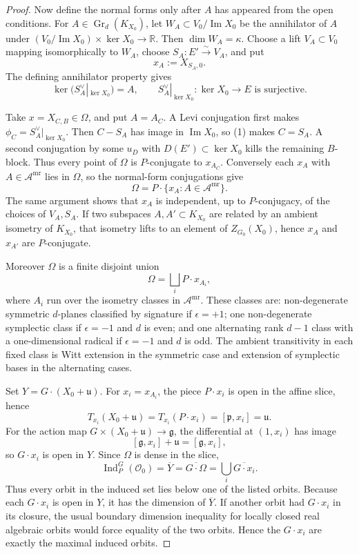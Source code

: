 \documentclass[10pt]{article}
\newcommand{\g}{\mathfrak g}
\newcommand{\uP}{\mathfrak u}
\newcommand{\OO}{\mathcal O}
\newcommand{\K}{K_{X_0}}
\newcommand{\Amr}{\mathscr A^{\mathrm{mr}}}
\newcommand{\im}{\operatorname{Im}}
\begin{document}
\begin{proof}
Now define the normal forms only after \(A\) has appeared from the open
conditions.  For \(A\in\operatorname{Gr}_d(\K)\), let
\(W_A\subset V_0/\im X_0\) be the annihilator of \(A\) under
\((V_0/\im X_0)\times\ker X_0\to\mathbb R\).  Then \(\dim W_A=\kappa\).
Choose a lift \(V_A\subset V_0\) mapping isomorphically to \(W_A\), choose
\(S_A:E'\xrightarrow{\sim}V_A\), and put
\[
x_A:=X_{S_A,0}.
\]
The defining annihilator property gives
\[
\ker(S_A^\vee|_{\ker X_0})=A,
\qquad S_A^\vee|_{\ker X_0}:\ker X_0\to E\text{ is surjective}.
\tag{3}
\]

Take \(x=X_{C,B}\in\Omega\), and put \(A=A_C\).  A Levi conjugation first makes
\(\phi_C=S_A^\vee|_{\ker X_0}\).  Then \(C-S_A\) has image in \(\im X_0\), so
(1) makes \(C=S_A\).  A second conjugation by some \(u_D\) with
\(D(E')\subset\ker X_0\) kills the remaining \(B\)-block.  Thus every point of
\(\Omega\) is \(P\)-conjugate to \(x_{A_C}\).  Conversely each
\(x_A\) with \(A\in\Amr\) lies in \(\Omega\), so the normal-form conjugations
give
\[
\Omega=P\cdot\{x_A:A\in\Amr\}.
\tag{4}
\]
The same argument shows that \(x_A\) is independent, up to \(P\)-conjugacy, of
the choices of \(V_A,S_A\).  If two subspaces \(A,A'\subset\K\) are related by
an ambient isometry of \(\K\), that isometry lifts to an element of
\(Z_{G_0}(X_0)\), hence \(x_A\) and \(x_{A'}\) are \(P\)-conjugate.

Moreover \(\Omega\) is a finite disjoint union
\[
\Omega=\bigsqcup_i P\cdot x_{A_i},
\tag{5}
\]
where \(A_i\) run over the isometry classes in \(\Amr\).  These classes are:
non-degenerate symmetric \(d\)-planes classified by signature if
\(\epsilon=+1\); one non-degenerate symplectic class if \(\epsilon=-1\) and
\(d\) is even; and one alternating rank \(d-1\) class with a one-dimensional
radical if \(\epsilon=-1\) and \(d\) is odd.  The ambient transitivity in each
fixed class is Witt extension in the symmetric case and extension of symplectic
bases in the alternating cases.

Set \(Y=G\cdot(X_0+\uP)\).  For \(x_i=x_{A_i}\), the piece
\(P\cdot x_i\) is open in the affine slice, hence
\[
T_{x_i}(X_0+\uP)=T_{x_i}(P\cdot x_i)=[\mathfrak p,x_i]=\uP.
\]
For the action map \(G\times(X_0+\uP)\to\g\), the differential at
\((1,x_i)\) has image
\[
[\g,x_i]+\uP=[\g,x_i],
\]
so \(G\cdot x_i\) is open in \(Y\).  Since \(\Omega\) is dense in the slice,
\[
\operatorname{Ind}_P^G(\OO_0)=\overline{Y}
=\overline{G\cdot\Omega}
=\bigcup_i \overline{G\cdot x_i}.
\tag{6}
\]
Thus every orbit in the induced set lies below one of the listed orbits.
Because each \(G\cdot x_i\) is open in \(Y\), it has the dimension of
\(\overline Y\).  If another orbit had \(G\cdot x_i\) in its closure, the usual
boundary dimension inequality for locally closed real algebraic orbits would
force equality of the two orbits.  Hence the \(G\cdot x_i\) are exactly the
maximal induced orbits.


\end{proof}
\end{document}
